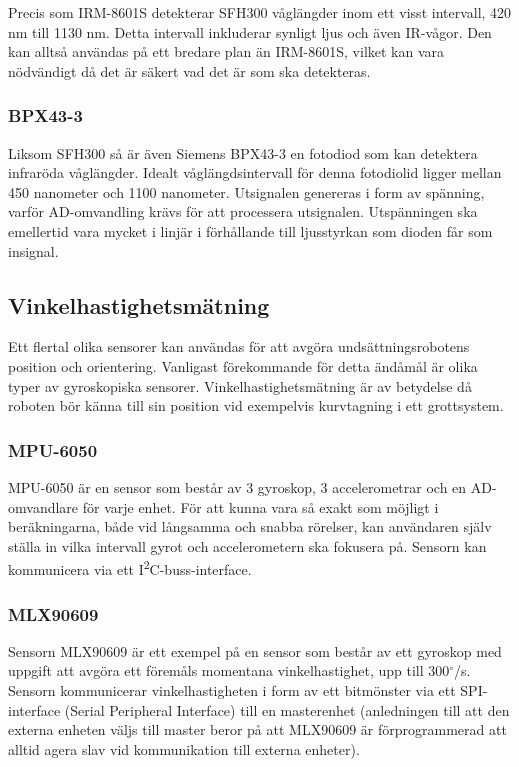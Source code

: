 \documentclass[11pt]{article}
\begin{document}
\begin{flushleft}
Precis som IRM-8601S detekterar SFH300 våglängder inom ett visst intervall, 420 nm till 1130 nm. Detta intervall inkluderar synligt ljus och även IR-vågor. Den kan alltså användas på ett bredare plan än IRM-8601S, vilket kan vara nödvändigt då det är säkert vad det är som ska detekteras. \cite{Osram}

\subsubsection{BPX43-3}
Liksom SFH300 så är även Siemens BPX43-3 en fotodiod som kan detektera infraröda våglängder. Idealt våglängdsintervall för denna fotodiolid ligger mellan 450 nanometer och 1100 nanometer. Utsignalen genereras i form av spänning, varför AD-omvandling krävs för att processera utsignalen. Utspänningen ska emellertid vara mycket i linjär i förhållande till ljusstyrkan som dioden får som insignal. \cite{siemens}

\subsection{Vinkelhastighetsmätning}
Ett flertal olika sensorer kan användas för att avgöra undsättningsrobotens position och orientering. Vanligast förekommande för detta ändåmål är olika typer av gyroskopiska sensorer. Vinkelhastighetsmätning är av betydelse då roboten bör känna till sin position vid exempelvis kurvtagning i ett grottsystem.

\subsubsection{MPU-6050}
MPU-6050 är en sensor som består av 3 gyroskop, 3 accelerometrar och en AD-omvandlare för varje enhet. För att kunna vara så exakt som möjligt i beräkningarna, både vid långsamma och snabba rörelser, kan användaren själv ställa in vilka intervall gyrot och accelerometern ska fokusera på. Sensorn kan kommunicera via ett I\textsuperscript{2}C-buss-interface. \cite{MPU}

\subsubsection{MLX90609}
Sensorn MLX90609 är ett exempel på en sensor som består av ett gyroskop med uppgift att avgöra ett föremåls momentana vinkelhastighet, upp till 300$^{\circ}$/s. Sensorn kommunicerar vinkelhastigheten i form av ett bitmönster via ett SPI-interface (Serial Peripheral Interface) till en masterenhet (anledningen till att den externa enheten väljs till master beror på att MLX90609 är förprogrammerad att alltid agera slav vid kommunikation till externa enheter). \cite{Melexis}


\end{flushleft}
\end{document}
